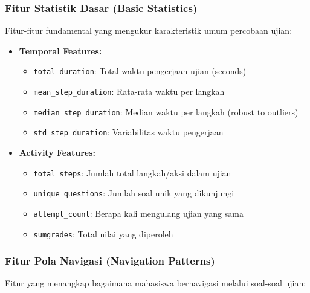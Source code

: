 \subsubsection{Fitur Statistik Dasar (Basic Statistics)}
\label{sec:fiturStatistikDasar}

Fitur-fitur fundamental yang mengukur karakteristik umum percobaan ujian:

\begin{itemize}
    \item \textbf{Temporal Features:}
    \begin{itemize}
        \item \texttt{total\_duration}: Total waktu pengerjaan ujian (seconds)
        \item \texttt{mean\_step\_duration}: Rata-rata waktu per langkah
        \item \texttt{median\_step\_duration}: Median waktu per langkah (robust to outliers)
        \item \texttt{std\_step\_duration}: Variabilitas waktu pengerjaan
    \end{itemize}
    
    \item \textbf{Activity Features:}
    \begin{itemize}
        \item \texttt{total\_steps}: Jumlah total langkah/aksi dalam ujian
        \item \texttt{unique\_questions}: Jumlah soal unik yang dikunjungi
        \item \texttt{attempt\_count}: Berapa kali mengulang ujian yang sama
        \item \texttt{sumgrades}: Total nilai yang diperoleh
    \end{itemize}
\end{itemize}

\subsubsection{Fitur Pola Navigasi (Navigation Patterns)}
\label{sec:fiturPolaNavigasi}

Fitur yang menangkap bagaimana mahasiswa bernavigasi melalui soal-soal ujian:

